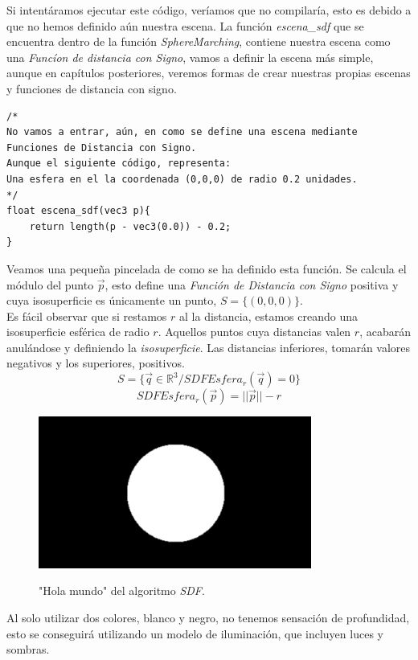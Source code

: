 \newpage
Si intentáramos ejecutar este código, veríamos que no compilaría, esto es debido a que no hemos definido aún nuestra escena. La función \textit{escena\_sdf} que se encuentra dentro de la función \textit{SphereMarching}, contiene nuestra escena como una \textit{Funcíon de distancia con Signo}, vamos a definir la escena más simple, aunque en capítulos posteriores, veremos formas de crear nuestras propias escenas y funciones de distancia con signo.
\begin{lstlisting}
/* 
No vamos a entrar, aún, en como se define una escena mediante Funciones de Distancia con Signo.
Aunque el siguiente código, representa:
Una esfera en el la coordenada (0,0,0) de radio 0.2 unidades.
*/
float escena_sdf(vec3 p){
    return length(p - vec3(0.0)) - 0.2;
}
\end{lstlisting}
Veamos una pequeña pincelada de como se ha definido esta función. Se calcula el módulo del punto \(\Vec{p}\), esto define una \textit{Función de Distancia con Signo} positiva y cuya isosuperficie es únicamente un punto, \(S=\{(0,0,0)\}\).\\Es fácil observar que si restamos \(r\) al la distancia, estamos creando una isosuperficie esférica de radio \(r\). Aquellos puntos cuya distancias valen \(r\), acabarán anulándose y definiendo la \textit{isosuperficie}. Las distancias inferiores, tomarán valores negativos y los superiores, positivos.
\[S=\{\Vec{q} \in \mathbb{R}^3 / SDFEsfera_r(\Vec{q})=0\}\]
\[ SDFEsfera_r(\Vec{p})=\vert\vert\Vec{p}\vert\vert - r  \]
\begin{figure}[H]
  \centering
  \captionsetup{justification=centering}%
  \includegraphics[width=0.8\textwidth]{secciones/imagenes/sdf1.jpeg}\label{fig:hello}
  \caption{"Hola mundo" del algoritmo \textit{SDF}.}
\end{figure}
Al solo utilizar dos colores, blanco y negro, no tenemos sensación de profundidad, esto se conseguirá utilizando un modelo de iluminación, que incluyen luces y sombras.